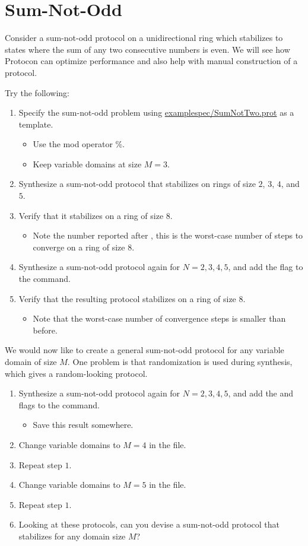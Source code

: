 \section{Sum-Not-Odd}

Consider a sum-not-odd protocol on a unidirectional ring which stabilizes to states where the sum of any two consecutive numbers is even.
We will see how Protocon can optimize performance and also help with manual construction of a protocol.

Try the following:
\begin{enumerate}
\item Specify the sum-not-odd problem using \href{\examplespec/SumNotTwo.prot}{examplespec/SumNotTwo.prot} as a template.
 \begin{itemize}
 \item Use the mod operator \%.
 \item Keep variable domains at size $M=3$.
 \end{itemize}
\item Synthesize a sum-not-odd protocol that stabilizes on rings of size $2$, $3$, $4$, and $5$.
\item Verify that it stabilizes on a ring of size $8$.
 \begin{itemize}
 \item Note the number reported after , this is the worst-case number of steps to converge on a ring of size $8$.
 \end{itemize}
\item Synthesize a sum-not-odd protocol again for $N=2,3,4,5$, and add the  flag to the command.
\item Verify that the resulting protocol stabilizes on a ring of size $8$.
 \begin{itemize}
 \item Note that the worst-case number of convergence steps is smaller than before.
 \end{itemize}
\end{enumerate}

We would now like to create a general sum-not-odd protocol for any variable domain of size $M$.
One problem is that randomization is used during synthesis, which gives a random-looking protocol.
\begin{enumerate}
\item Synthesize a sum-not-odd protocol again for $N=2,3,4,5$, and add the  and  flags to the command.
 \begin{itemize}
 \item Save this result somewhere.
 \end{itemize}
\item Change variable domains to $M=4$ in the file.
\item Repeat step $1$.
\item Change variable domains to $M=5$ in the file.
\item Repeat step $1$.
\item Looking at these protocols, can you devise a sum-not-odd protocol that stabilizes for any domain size $M$?
\end{enumerate}


